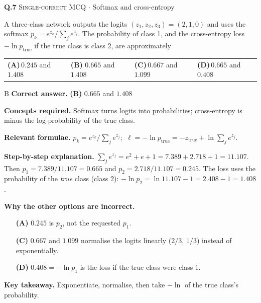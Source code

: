 \documentclass[11pt,a4paper]{article}
\newcommand{\optlabel}[1]{\textbf{(#1)}}
\newcommand{\correctlabel}[1]{\textcolor{okgreen}{\textbf{(#1)}\,\ding{51}}}
\newenvironment{qitem}[1]{\begin{list}{}{\setlength{\leftmargin}{3.3em}\setlength{\labelwidth}{3.1em}%
  \setlength{\labelsep}{0.2em}\setlength{\topsep}{3pt}\setlength{\parsep}{3pt}}\item[\textbf{Q.#1}\hfill]}{\end{list}}
\newcommand{\qsep}{\par\vspace{2pt}{\color{black!15}\hrule}\vspace{4pt}}
\newcommand{\qmeta}[2]{{\footnotesize\color{black!60}\textsc{#1} \;$\cdot$\; #2}\par}
\begin{document}
\begin{qitem}{7}
\qmeta{Single-correct MCQ}{Softmax and cross-entropy}
A three-class network outputs the logits $(z_1, z_2, z_3) = (2, 1, 0)$ and uses the softmax
$p_k = e^{z_k}/\sum_j e^{z_j}$. The probability of class 1, and the cross-entropy loss $-\ln p_{\text{true}}$ if the true
class is class 2, are approximately
\par\smallskip\noindent\begin{tabularx}{\linewidth}{@{}*{4}{L}@{}}
\optlabel{A}\,$0.245$ and $1.408$ & \correctlabel{B}\,$0.665$ and $1.408$ & \optlabel{C}\,$0.667$ and $1.099$ & \optlabel{D}\,$0.665$ and $0.408$
\end{tabularx}
\end{qitem}
\begin{solbox}{B}
\textbf{\color{brand}Correct answer.} \textcolor{okgreen}{\textbf{(B)}} $0.665$ and $1.408$

\textbf{\color{brand}Concepts required.} Softmax turns logits into probabilities; cross-entropy is minus the log-probability of the true class.

\textbf{\color{brand}Relevant formulae.} $p_k = e^{z_k}/\sum_je^{z_j}$; $\ \ell = -\ln p_{\text{true}} = -z_{\text{true}} + \ln\sum_je^{z_j}$.

\textbf{\color{brand}Step-by-step explanation.} $\sum_j e^{z_j} = e^2 + e + 1 = 7.389 + 2.718 + 1 = 11.107$. Then $p_1 = 7.389/11.107 = 0.665$ and
$p_2 = 2.718/11.107 = 0.245$. The loss uses the probability of the \emph{true} class (class 2):
$-\ln p_2 = \ln 11.107 - 1 = 2.408 - 1 = 1.408$.

\textbf{\color{brand}Why the other options are incorrect.}
\begin{itemize}[leftmargin=2.4em, itemsep=1pt, topsep=2pt]
\item[\textbf{(A)}] $0.245$ is $p_2$, not the requested $p_1$.
\item[\textbf{(C)}] $0.667$ and $1.099$ normalise the logits linearly ($2/3$, $1/3$) instead of exponentially.
\item[\textbf{(D)}] $0.408 = -\ln p_1$ is the loss if the true class were class 1.
\end{itemize}
\textbf{\color{brand}Key takeaway.} Exponentiate, normalise, then take $-\ln$ of the true class's probability.
\end{solbox}
\qsep
\end{document}
